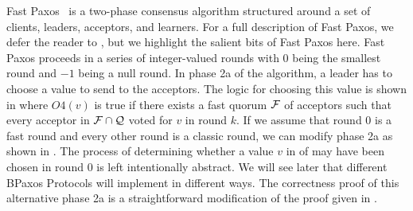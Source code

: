 Fast Paxos~\cite{lamport2006fast} is a two-phase consensus algorithm structured
around a set of clients, leaders, acceptors, and learners. For a full
description of Fast Paxos, we defer the reader to \cite{lamport2006fast}, but
we highlight the salient bits of Fast Paxos here. Fast Paxos proceeds in a
series of integer-valued rounds with $0$ being the smallest round and $-1$
being a null round. In phase 2a of the algorithm, a leader has to choose a
value to send to the acceptors. The logic for choosing this value is shown in
 where $O4(v)$ is true if there exists a fast quorum
$\mathcal{F}$ of acceptors such that every acceptor in $\mathcal{F} \cap
\mathcal{Q}$ voted for $v$ in round $k$.
%
If we assume that round $0$ is a fast round and every other round is a classic
round, we can modify phase 2a as shown in . The process
of determining whether a value $v$ in  of
 may have been chosen in round $0$ is left
intentionally abstract. We will see later that different BPaxos Protocols will
implement  in different ways. The correctness proof
of this alternative phase 2a is a straightforward modification of the proof
given in \cite{lamport2006fast}.
